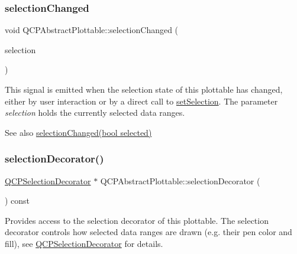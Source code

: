 \subsubsection{\texorpdfstring{selection\+Changed}{selectionChanged}\hspace{0.1cm}{\footnotesize\ttfamily [2/2]}}
{\footnotesize\ttfamily void Q\+C\+P\+Abstract\+Plottable\+::selection\+Changed (\begin{DoxyParamCaption}\item[{const \hyperlink{class_q_c_p_data_selection}{Q\+C\+P\+Data\+Selection} \&}]{selection }\end{DoxyParamCaption})\hspace{0.3cm}{\ttfamily [signal]}}

This signal is emitted when the selection state of this plottable has changed, either by user interaction or by a direct call to \hyperlink{class_q_c_p_abstract_plottable_a219bc5403a9d85d3129165ec3f5ae436}{set\+Selection}. The parameter {\itshape selection} holds the currently selected data ranges.

\begin{DoxySeeAlso}{See also}
\hyperlink{class_q_c_p_abstract_plottable_a3af66432b1dca93b28e00e78a8c7c1d9}{selection\+Changed(bool selected)} 
\end{DoxySeeAlso}
\mbox{\label{class_q_c_p_abstract_plottable_a7861518e47ca0c6a0c386032c2db075e}} 
\subsubsection{\texorpdfstring{selection\+Decorator()}{selectionDecorator()}}
{\footnotesize\ttfamily \hyperlink{class_q_c_p_selection_decorator}{Q\+C\+P\+Selection\+Decorator} $\ast$ Q\+C\+P\+Abstract\+Plottable\+::selection\+Decorator (\begin{DoxyParamCaption}{ }\end{DoxyParamCaption}) const\hspace{0.3cm}{\ttfamily [inline]}}

Provides access to the selection decorator of this plottable. The selection decorator controls how selected data ranges are drawn (e.\+g. their pen color and fill), see \hyperlink{class_q_c_p_selection_decorator}{Q\+C\+P\+Selection\+Decorator} for details.

